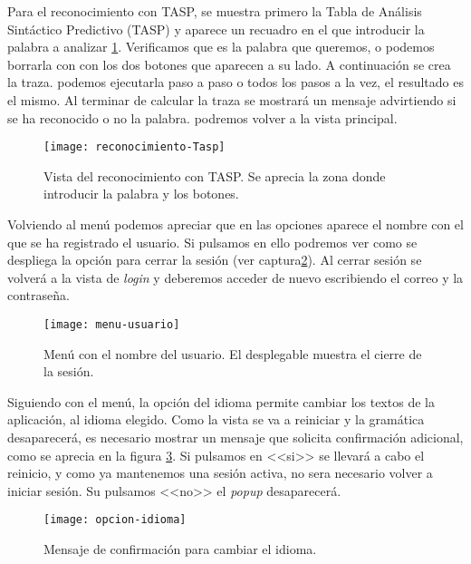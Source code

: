 Para el reconocimiento con TASP, se muestra primero la Tabla de Análisis Sintáctico Predictivo (TASP) y aparece un recuadro en el que introducir la palabra a analizar \ref{fig:6.10}. Verificamos que es la palabra que queremos, o podemos borrarla con con los dos botones que aparecen a su lado. A continuación se crea la traza. podemos ejecutarla paso a paso o todos los pasos a la vez, el resultado es el mismo. Al terminar de calcular la traza se mostrará un mensaje advirtiendo si se ha reconocido o no la palabra. podremos volver a la vista principal.

\begin{figure}[h]
\centering
\texttt{[image: reconocimiento-Tasp]}
\caption{Vista del reconocimiento con TASP. Se aprecia la zona donde introducir la palabra y los botones.}
\label{fig:6.10}
\end{figure}

Volviendo al menú podemos apreciar que en las opciones aparece el nombre con el que se ha registrado el usuario. Si pulsamos en ello podremos ver como se despliega la opción para cerrar la sesión (ver captura\ref{fig:6.11}). Al cerrar sesión se volverá a la vista de \emph{login} y deberemos acceder de nuevo escribiendo el correo y la contraseña.

\begin{figure}[h]
\centering
\texttt{[image: menu-usuario]}
\caption{Menú con el nombre del usuario. El desplegable muestra el cierre de la sesión.}
\label{fig:6.11}
\end{figure}

Siguiendo con el menú, la opción del idioma permite cambiar los textos de la aplicación, al idioma elegido. Como la vista se va a reiniciar y la gramática desaparecerá, es necesario mostrar un mensaje que solicita confirmación adicional, como se aprecia en la figura \ref{fig:6.12}. Si pulsamos en <<si>> se llevará a cabo el reinicio, y como ya mantenemos una sesión activa, no sera necesario volver a iniciar sesión. Su pulsamos <<no>> el \emph{popup} desaparecerá.

\begin{figure}[h]
\centering
\texttt{[image: opcion-idioma]}
\caption{Mensaje de confirmación para cambiar el idioma.}
\label{fig:6.12}
\end{figure}

